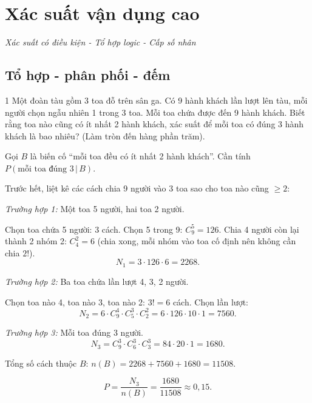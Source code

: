 
\chapter{Xác suất vận dụng cao}
\begin{center}
  \textit{\color{ForumDarkGray}Xác suất có điều kiện - Tổ hợp logic - Cấp số nhân}
\end{center}

\section{Tổ hợp - phân phối - đếm}

\begin{baitoan}{1 \hfill {}}
Một đoàn tàu gồm 3 toa đỗ trên sân ga. Có 9 hành khách lần lượt lên tàu, mỗi người chọn ngẫu nhiên 1 trong 3 toa. Mỗi toa chứa được đến 9 hành khách. Biết rằng toa nào cũng có ít nhất 2 hành khách, xác suất để mỗi toa có đúng 3 hành khách là bao nhiêu? (Làm tròn đến hàng phần trăm).
\end{baitoan}

\begin{loigiai}
Gọi $B$ là biến cố ``mỗi toa đều có ít nhất 2 hành khách''. Cần tính $P(\text{mỗi toa đúng 3}\,|\,B)$.

Trước hết, liệt kê các cách chia 9 người vào 3 toa sao cho toa nào cũng $\ge 2$:

\textit{Trường hợp 1:} Một toa 5 người, hai toa 2 người.

Chọn toa chứa 5 người: 3 cách. Chọn 5 trong 9: $C_9^5 = 126$. Chia 4 người còn lại thành 2 nhóm 2: $C_4^2 = 6$ (chia xong, mỗi nhóm vào toa cố định nên không cần chia $2!$).
\[ N_1 = 3 \cdot 126 \cdot 6 = 2268. \]

\textit{Trường hợp 2:} Ba toa chứa lần lượt 4, 3, 2 người.

Chọn toa nào 4, toa nào 3, toa nào 2: $3! = 6$ cách. Chọn lần lượt:
\[ N_2 = 6 \cdot C_9^4 \cdot C_5^3 \cdot C_2^2 = 6 \cdot 126 \cdot 10 \cdot 1 = 7560. \]

\textit{Trường hợp 3:} Mỗi toa đúng 3 người.
\[ N_3 = C_9^3 \cdot C_6^3 \cdot C_3^3 = 84 \cdot 20 \cdot 1 = 1680. \]

Tổng số cách thuộc $B$: $n(B) = 2268 + 7560 + 1680 = 11508$.

\[ P = \frac{N_3}{n(B)} = \frac{1680}{11508} \approx \boxed{0{,}15}. \]
\end{loigiai}

